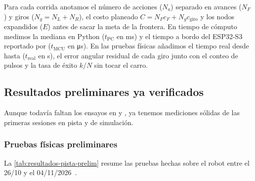 Para cada corrida anotamos el número de acciones ($N_a$) separado en avances ($N_F$) y giros ($N_g = N_L + N_R$), el costo planeado $C = N_F c_F + N_g c_{\text{giro}}$ y los nodos expandidos ($E$) antes de sacar la meta de la frontera. En tiempo de cómputo medimos la mediana en Python ($t_{\text{PC}}$ en \si{\milli\second}) y el tiempo a bordo del ESP32-S3 reportado por  ($t_{\text{MCU}}$ en \si{\micro\second}). En las pruebas físicas añadimos el tiempo real desde  hasta  ($t_{\text{real}}$ en \si{\second}), el error angular residual de cada giro junto con el conteo de pulsos y la tasa de éxito $k/N$ sin tocar el carro.

\subsection{Resultados preliminares ya verificados}
\label{subsec:resultados-preliminares}

Aunque todavía faltan los ensayos en  y , ya tenemos mediciones sólidas de las primeras sesiones en pista y de simulación.

\subsubsection{Pruebas físicas preliminares}

La \cref{tab:resultados-pista-prelim} resume las pruebas hechas sobre el robot entre el 26/10 y el 04/11/2026~\cite{arquitectura2026doc,handoff2026doc}.

